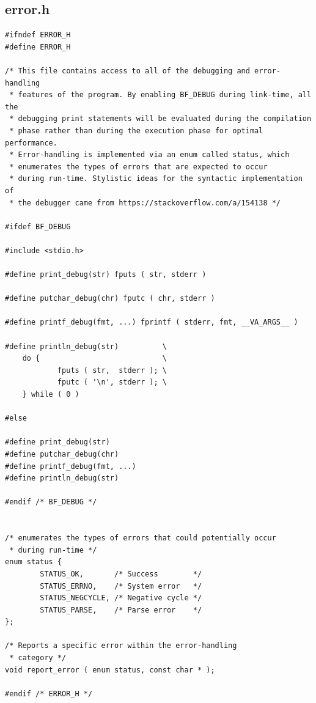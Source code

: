 \documentclass[11pt]{article}
\begin{document}
\subsection{error.h}
\begin{verbatim}
#ifndef ERROR_H
#define ERROR_H

/* This file contains access to all of the debugging and error-handling
 * features of the program. By enabling BF_DEBUG during link-time, all the
 * debugging print statements will be evaluated during the compilation
 * phase rather than during the execution phase for optimal performance.
 * Error-handling is implemented via an enum called status, which
 * enumerates the types of errors that are expected to occur
 * during run-time. Stylistic ideas for the syntactic implementation of
 * the debugger came from https://stackoverflow.com/a/154138 */

#ifdef BF_DEBUG

#include <stdio.h>

#define print_debug(str) fputs ( str, stderr )

#define putchar_debug(chr) fputc ( chr, stderr )

#define printf_debug(fmt, ...) fprintf ( stderr, fmt, __VA_ARGS__ )

#define println_debug(str)          \
    do {                            \
            fputs ( str,  stderr ); \
            fputc ( '\n', stderr ); \
    } while ( 0 )

#else

#define print_debug(str)
#define putchar_debug(chr)
#define printf_debug(fmt, ...)
#define println_debug(str)

#endif /* BF_DEBUG */


/* enumerates the types of errors that could potentially occur
 * during run-time */
enum status {
        STATUS_OK,       /* Success        */
        STATUS_ERRNO,    /* System error   */
        STATUS_NEGCYCLE, /* Negative cycle */
        STATUS_PARSE,    /* Parse error    */
};

/* Reports a specific error within the error-handling
 * category */
void report_error ( enum status, const char * );

#endif /* ERROR_H */
\end{verbatim}
\newpage
\end{document}
